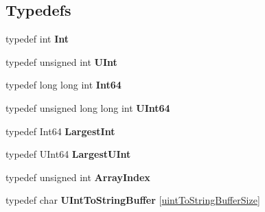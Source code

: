 \subsection*{Typedefs}
\begin{DoxyCompactItemize}
\item 
\hypertarget{namespace_json_a08122e8005b706d982e48cca1e2119c7}{typedef int {\bfseries Int}}\label{namespace_json_a08122e8005b706d982e48cca1e2119c7}

\item 
\hypertarget{namespace_json_a800fb90eb6ee8d5d62b600c06f87f7d4}{typedef unsigned int {\bfseries U\-Int}}\label{namespace_json_a800fb90eb6ee8d5d62b600c06f87f7d4}

\item 
\hypertarget{namespace_json_ab7b47d2905da3b4ae60e4e800ec9ae5f}{typedef long long int {\bfseries Int64}}\label{namespace_json_ab7b47d2905da3b4ae60e4e800ec9ae5f}

\item 
\hypertarget{namespace_json_a01f20bce8f8229f38ff890168c0e6452}{typedef unsigned long long int {\bfseries U\-Int64}}\label{namespace_json_a01f20bce8f8229f38ff890168c0e6452}

\item 
\hypertarget{namespace_json_a218d880af853ce786cd985e82571d297}{typedef Int64 {\bfseries Largest\-Int}}\label{namespace_json_a218d880af853ce786cd985e82571d297}

\item 
\hypertarget{namespace_json_ae202ecad69725e23443f465e257456d0}{typedef U\-Int64 {\bfseries Largest\-U\-Int}}\label{namespace_json_ae202ecad69725e23443f465e257456d0}

\item 
\hypertarget{namespace_json_a8048e741f2177c3b5d9ede4a5b8c53c2}{typedef unsigned int {\bfseries Array\-Index}}\label{namespace_json_a8048e741f2177c3b5d9ede4a5b8c53c2}

\item 
\hypertarget{namespace_json_a602bcf69c2042fb61c3b243cb16f04ca}{typedef char {\bfseries U\-Int\-To\-String\-Buffer} \mbox{[}\hyperlink{namespace_json_a0c5f614b019f20b4598dcaec09d9e820ae4f2008c7919f20d81286121d1374424}{uint\-To\-String\-Buffer\-Size}\mbox{]}}\label{namespace_json_a602bcf69c2042fb61c3b243cb16f04ca}

\end{DoxyCompactItemize}
